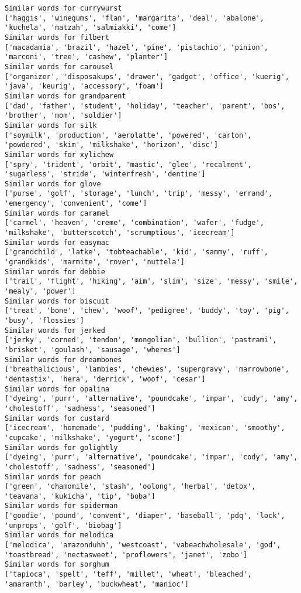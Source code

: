 \documentclass[11pt]{article}
\begin{document}
\begin{Verbatim}[commandchars=\\\{\}]
Similar words for currywurst
['haggis', 'winegums', 'flan', 'margarita', 'deal', 'abalone', 'kuchela', 'matzah', 'salmiakki', 'come']
Similar words for filbert
['macadamia', 'brazil', 'hazel', 'pine', 'pistachio', 'pinion', 'marconi', 'tree', 'cashew', 'planter']
Similar words for carousel
['organizer', 'disposakups', 'drawer', 'gadget', 'office', 'kuerig', 'java', 'keurig', 'accessory', 'foam']
Similar words for grandparent
['dad', 'father', 'student', 'holiday', 'teacher', 'parent', 'bos', 'brother', 'mom', 'soldier']
Similar words for silk
['soymilk', 'production', 'aerolatte', 'powered', 'carton', 'powdered', 'skim', 'milkshake', 'horizon', 'disc']
Similar words for xylichew
['spry', 'trident', 'orbit', 'mastic', 'glee', 'recalment', 'sugarless', 'stride', 'winterfresh', 'dentine']
Similar words for glove
['purse', 'golf', 'storage', 'lunch', 'trip', 'messy', 'errand', 'emergency', 'convenient', 'come']
Similar words for caramel
['carmel', 'heaven', 'creme', 'combination', 'wafer', 'fudge', 'milkshake', 'butterscotch', 'scrumptious', 'icecream']
Similar words for easymac
['grandchild', 'latke', 'tobteachable', 'kid', 'sammy', 'ruff', 'grandkids', 'marmite', 'rover', 'nuttela']
Similar words for debbie
['trail', 'flight', 'hiking', 'aim', 'slim', 'size', 'messy', 'smile', 'mealy', 'power']
Similar words for biscuit
['treat', 'bone', 'chew', 'woof', 'pedigree', 'buddy', 'toy', 'pig', 'busy', 'flossies']
Similar words for jerked
['jerky', 'corned', 'tendon', 'mongolian', 'bullion', 'pastrami', 'brisket', 'goulash', 'sausage', 'wheres']
Similar words for dreambones
['breathalicious', 'lambies', 'chewies', 'supergravy', 'marrowbone', 'dentastix', 'hera', 'derrick', 'woof', 'cesar']
Similar words for opalina
['dyeing', 'purr', 'alternative', 'poundcake', 'impar', 'cody', 'amy', 'cholestoff', 'sadness', 'seasoned']
Similar words for custard
['icecream', 'homemade', 'pudding', 'baking', 'mexican', 'smoothy', 'cupcake', 'milkshake', 'yogurt', 'scone']
Similar words for golightly
['dyeing', 'purr', 'alternative', 'poundcake', 'impar', 'cody', 'amy', 'cholestoff', 'sadness', 'seasoned']
Similar words for peach
['green', 'chamomile', 'stash', 'oolong', 'herbal', 'detox', 'teavana', 'kukicha', 'tip', 'boba']
Similar words for spiderman
['goodie', 'pound', 'convent', 'diaper', 'baseball', 'pdq', 'lock', 'unprops', 'golf', 'biobag']
Similar words for melodica
['melodica', 'amazonduhh', 'westcoast', 'vabeachwholesale', 'god', 'toastbread', 'nectasweet', 'proflowers', 'janet', 'zobo']
Similar words for sorghum
['tapioca', 'spelt', 'teff', 'millet', 'wheat', 'bleached', 'amaranth', 'barley', 'buckwheat', 'manioc']

\end{Verbatim}
\end{document}
